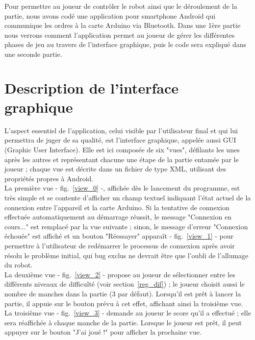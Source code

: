 Pour permettre au joueur de contrôler le robot ainsi que le déroulement de la partie, nous avons codé une application pour smartphone Android qui communique les ordres à la carte Arduino via Bluetooth. Dans une 1ère partie nous verrons comment l'application permet au joueur de gérer les différentes phases de jeu au travers de l'interface graphique, puis le code sera expliqué dans une seconde partie.

\section{Description de l'interface graphique}

\label{andr_gui}

\graphicspath{{rc/images/android/}}

L’aspect essentiel de l’application, celui visible par l’utilisateur final et qui lui permettra de juger de sa qualité, est l’interface graphique, appelée aussi GUI (Graphic User Interface). Elle est ici composée de six "vues", défilants les unes après les autres et représentant chacune une étape de la partie entamée par le joueur ; chaque vue est décrite dans un fichier de type XML, utilisant des propriétés propres à Android. \\
La première vue - fig.~\ref{view_0} -, affichée dès le lancement du programme, est très simple et se contente d’afficher un champ textuel indiquant l’état actuel de la connexion entre l’appareil et la carte Arduino. Si la tentative de connexion effectuée automatiquement au démarrage réussit, le message "Connexion en cours..." est remplacé par la vue suivante ; sinon, le message d’erreur "Connexion échouée" est affiché et un bouton "Réessayer" apparaît - fig.~\ref{view_1} - pour permettre à l’utilisateur de redémarrer le processus de connexion après avoir résolu le problème initial, qui bug exclus ne devrait être que l’oubli de l’allumage du robot. \\
La deuxième vue - fig.~\ref{view_2} - propose au joueur de sélectionner entre les différents niveaux de difficulté (voir section~\ref{reg_dif}) ; le joueur choisit aussi le nombre de manches dans la partie (3 par défaut). Lorsqu’il est prêt à lancer la partie, il appuie sur le bouton prévu à cet effet, affichant ainsi la troisième vue. \\
La troisième vue - fig.~\ref{view_3} - demande au joueur le score qu’il a effectué ; elle sera réaffichée à chaque manche de la partie. Lorsque le joueur est prêt, il peut appuyer sur le bouton "J’ai joué !" pour afficher la prochaine vue. \\
